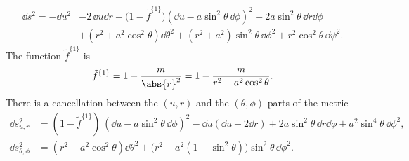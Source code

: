 \begin{equation}
	\begin{aligned}
	\dd s^2 = - \dd u^2 &- 2\, \dd u \dd r
		+ \big(1 - \tilde f^{\{1\}} \big) (\dd u - a \sin^2 \theta\, \dd \phi)^2
		+ 2 a \sin^2 \theta\, \dd r \dd \phi \\
		&+ (r^2 + a^2 \cos^2 \theta) \dd\theta^2
		+ (r^2 + a^2) \sin^2 \theta\, \dd\phi^2
		+ r^2 \cos^2 \theta\, \dd \psi^2.
	\end{aligned}
\end{equation} 
The function $\tilde f^{\{1\}}$ is
\begin{equation}
	\tilde f^{\{1\}} = 1 - \frac{m}{\abs{r}^2} = 1 - \frac{m}{r^2 + a^2 \cos^2 \theta}.
\end{equation} 
There is a cancellation between the $(u, r)$ and the $(\theta, \phi)$ parts of the metric
\begin{subequations}
\begin{align}
	\dd s_{u,r}^2 &= (1 - \tilde f^{\{1\}})\, (\dd u - a \sin^2 \theta\, \dd \phi)^2
		- \dd u (\dd u + 2 \dd r )
		+ 2 a \sin^2 \theta \, \dd r \dd \phi
		+ a^2 \sin^4 \theta\, \dd \phi^2, \\
	\dd s_{\theta,\phi}^2 &= (r^2 + a^2 \cos^2 \theta) \dd\theta^2
			+ \big(r^2 + a^2 (1 - \sin^2 \theta) \big) \sin^2 \theta\, \dd\phi^2.
\end{align}
\end{subequations}

